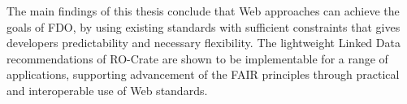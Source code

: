 \begin{small}
The main findings of this thesis conclude that Web approaches can achieve the goals of FDO, by using existing standards with sufficient constraints that gives developers predictability and necessary flexibility. The lightweight Linked Data recommendations of RO-Crate are shown to be implementable for a range of applications, supporting advancement of the FAIR principles through practical and interoperable use of Web standards. 

\end{small}